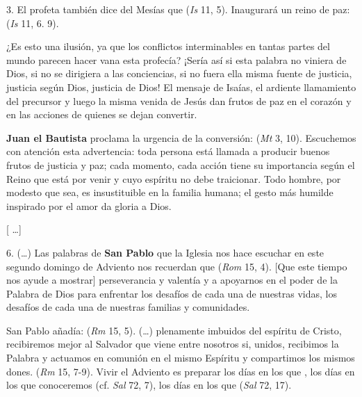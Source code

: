 \begin{body}
					3. El profeta también dice del Mesías que  (\emph{Is} 11, 5). Inaugurará un reino de paz:  (\emph{Is} 11, 6. 9). 
					
					¿Es esto una ilusión, ya que los conflictos interminables en tantas partes del mundo parecen hacer vana esta profecía? ¡Sería así si esta palabra no viniera de Dios, si no se dirigiera a las conciencias, si no fuera ella misma fuente de justicia, justicia según Dios, justicia de Dios! El mensaje de Isaías, el ardiente llamamiento del precursor y luego la misma venida de Jesús dan frutos de paz en el corazón y en las acciones de quienes se dejan convertir. 
					
					\textbf{Juan el Bautista} proclama la urgencia de la conversión:  (\emph{Mt} 3, 10). Escuchemos con atención esta advertencia: toda persona está llamada a producir buenos frutos de justicia y paz; cada momento, cada acción tiene su importancia según el Reino que está por venir y cuyo espíritu no debe traicionar. Todo hombre, por modesto que sea, es insustituible en la familia humana; el gesto más humilde inspirado por el amor da gloria a Dios.
					
					{[} \ldots{}{]}
					
					6. (\ldots{}) Las palabras de \textbf{San Pablo} que la Iglesia nos hace escuchar en este segundo domingo de Adviento nos recuerdan que  (\emph{Rom} 15, 4). {[}Que este tiempo nos ayude a mostrar{]} perseverancia y valentía y a apoyarnos en el poder de la Palabra de Dios para enfrentar los desafíos de cada una de nuestras vidas, los desafíos de cada una de nuestras familias y comunidades.
					
					San Pablo añadía:  (\emph{Rm} 15, 5). (\ldots{}) plenamente imbuidos del espíritu de Cristo, recibiremos mejor al Salvador que viene entre nosotros si, unidos, recibimos la Palabra y actuamos en comunión en el mismo Espíritu y compartimos los mismos dones.  (\emph{Rm} 15, 7-9). Vivir el Adviento es preparar los días en los que , los días en los que conoceremos  (cf. \emph{Sal} 72, 7), los días en los que  (\emph{Sal} 72, 17).
					

\end{body}
